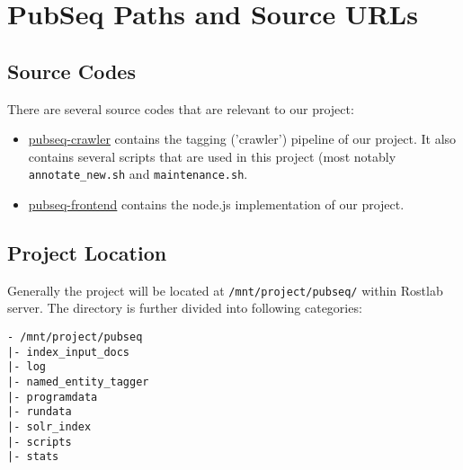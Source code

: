 
\chapter{PubSeq Paths and Source URLs} %

\label{AppendixA} %



\section{Source Codes}

There are several source codes that are relevant to our project:

\begin{itemize}
\item \href{https://rostlab.informatik.tu-muenchen.de/gitlab/gyachdav/pubseq-crawler}{pubseq-crawler} contains the tagging ('crawler') pipeline of our project. It also contains several scripts that are used in this project (most notably \texttt{annotate\_new.sh} and \texttt{maintenance.sh}.
\item \href{https://rostlab.informatik.tu-muenchen.de/gitlab/gyachdav/pubseq-frontend}{pubseq-frontend} contains the node.js implementation of our project.
\end{itemize}


\section{Project Location}

Generally the project will be located at \texttt{/mnt/project/pubseq/} within Rostlab server. The directory is further divided into following categories:

\begin{verbatim}
- /mnt/project/pubseq
|- index_input_docs
|- log
|- named_entity_tagger
|- programdata
|- rundata
|- solr_index
|- scripts
|- stats 
\end{verbatim}

